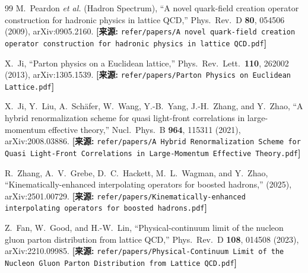 \documentclass[12pt,a4paper]{ctexart}
\theoremstyle{definition}
\begin{document}
\begin{thebibliography}{99}
M.~Peardon \textit{et al.} (Hadron Spectrum),
``A novel quark-field creation operator construction for hadronic physics in lattice QCD,''
Phys.\ Rev.\ D \textbf{80}, 054506 (2009), arXiv:0905.2160.
\quad\textbf{[来源:} \texttt{refer/papers/A novel quark-field creation operator construction for hadronic physics in lattice QCD.pdf}\textbf{]}


X.~Ji,
``Parton physics on a Euclidean lattice,''
Phys.\ Rev.\ Lett.\ \textbf{110}, 262002 (2013), arXiv:1305.1539.
\quad\textbf{[来源:} \texttt{refer/papers/Parton Physics on Euclidean Lattice.pdf}\textbf{]}

X.~Ji, Y.~Liu, A.~Sch\"afer, W.~Wang, Y.-B.~Yang, J.-H.~Zhang, and Y.~Zhao,
``A hybrid renormalization scheme for quasi light-front correlations in large-momentum effective theory,''
Nucl.\ Phys.\ B \textbf{964}, 115311 (2021), arXiv:2008.03886.
\quad\textbf{[来源:} \texttt{refer/papers/A Hybrid Renormalization Scheme for Quasi Light-Front Correlations in Large-Momentum Effective Theory.pdf}\textbf{]}


R.~Zhang, A.~V.~Grebe, D.~C.~Hackett, M.~L.~Wagman, and Y.~Zhao,
``Kinematically-enhanced interpolating operators for boosted hadrons,''
(2025), arXiv:2501.00729.
\quad\textbf{[来源:} \texttt{refer/papers/Kinematically-enhanced interpolating operators for boosted hadrons.pdf}\textbf{]}

Z.~Fan, W.~Good, and H.-W.~Lin,
``Physical-continuum limit of the nucleon gluon parton distribution from lattice QCD,''
Phys.\ Rev.\ D \textbf{108}, 014508 (2023), arXiv:2210.09985.
\quad\textbf{[来源:} \texttt{refer/papers/Physical-Continuum Limit of the Nucleon Gluon Parton Distribution from Lattice QCD.pdf}\textbf{]}

\end{thebibliography}
\end{document}
